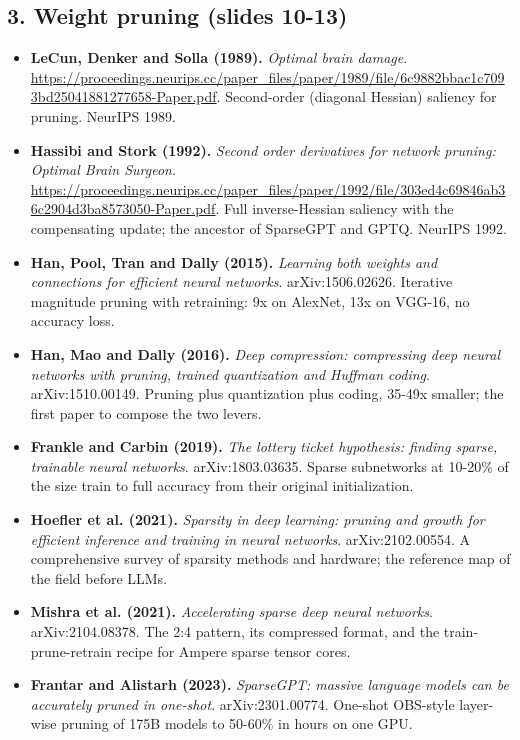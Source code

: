 \documentclass[11pt,letterpaper]{article}
\begin{document}
\subsection*{3. Weight pruning (slides 10-13)}
\begin{itemize}[leftmargin=1.2em,itemsep=3pt]\sloppy
\item \textbf{LeCun, Denker and Solla (1989).} \textit{Optimal brain damage}. \url{https://proceedings.neurips.cc/paper_files/paper/1989/file/6c9882bbac1c7093bd25041881277658-Paper.pdf}. Second-order (diagonal Hessian) saliency for pruning. NeurIPS 1989.
\item \textbf{Hassibi and Stork (1992).} \textit{Second order derivatives for network pruning: Optimal Brain Surgeon}. \url{https://proceedings.neurips.cc/paper_files/paper/1992/file/303ed4c69846ab36c2904d3ba8573050-Paper.pdf}. Full inverse-Hessian saliency with the compensating update; the ancestor of SparseGPT and GPTQ. NeurIPS 1992.
\item \textbf{Han, Pool, Tran and Dally (2015).} \textit{Learning both weights and connections for efficient neural networks}. arXiv:1506.02626. Iterative magnitude pruning with retraining: 9x on AlexNet, 13x on VGG-16, no accuracy loss.
\item \textbf{Han, Mao and Dally (2016).} \textit{Deep compression: compressing deep neural networks with pruning, trained quantization and Huffman coding}. arXiv:1510.00149. Pruning plus quantization plus coding, 35-49x smaller; the first paper to compose the two levers.
\item \textbf{Frankle and Carbin (2019).} \textit{The lottery ticket hypothesis: finding sparse, trainable neural networks}. arXiv:1803.03635. Sparse subnetworks at 10-20\% of the size train to full accuracy from their original initialization.
\item \textbf{Hoefler et al. (2021).} \textit{Sparsity in deep learning: pruning and growth for efficient inference and training in neural networks}. arXiv:2102.00554. A comprehensive survey of sparsity methods and hardware; the reference map of the field before LLMs.
\item \textbf{Mishra et al. (2021).} \textit{Accelerating sparse deep neural networks}. arXiv:2104.08378. The 2:4 pattern, its compressed format, and the train-prune-retrain recipe for Ampere sparse tensor cores.
\item \textbf{Frantar and Alistarh (2023).} \textit{SparseGPT: massive language models can be accurately pruned in one-shot}. arXiv:2301.00774. One-shot OBS-style layer-wise pruning of 175B models to 50-60\% in hours on one GPU.

\end{itemize}
\end{document}
